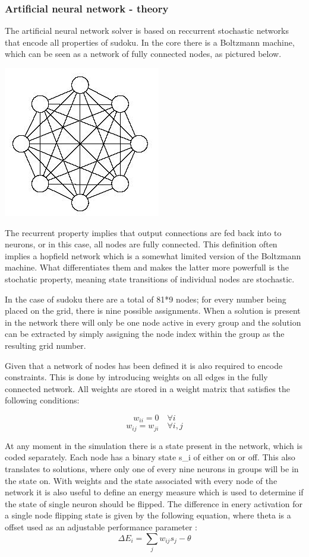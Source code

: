 \documentclass[a4paper,11pt]{kth-mag}
\begin{document}
\subsubsection{Artificial neural network - theory}
The artificial neural network solver is based on reccurrent stochastic networks that encode all properties of sudoku.
In the core there is a Boltzmann machine, which can be seen as a network of fully connected nodes, as pictured below.

\includegraphics{images/neural1.png}

The recurrent property implies that output connections are fed back into to neurons, or in this case, all nodes are fully connected.
This definition often implies a hopfield network which is a somewhat limited version of the Boltzmann machine.
What differentiates them and makes the latter more powerfull is the stochatic property, meaning state transitions of individual nodes are stochastic.

In the case of sudoku there are a total of 81*9 nodes; for every number being placed on the grid, there is nine possible assignments.
When a solution is present in the network there will only be one node active in every group and the solution can be extracted by simply assigning the node index within the group as the resulting grid number.

Given that a network of nodes has been defined it is also required to encode constraints.
This is done by introducing weights on all edges in the fully connected network.
All weights are stored in a weight matrix that satisfies the following conditions:

\[
w_{ii} = 0 \quad \forall i
\]
\[
w_{ij} = w_{ji} \quad \forall i,j
\]

At any moment in the simulation there is a state present in the network, which is coded separately.
Each node has a binary state s\_i of either on or off.
This also translates to solutions, where only one of every nine neurons in groups will be in the state on.
With weights and the state associated with every node of the network it is also useful to define an energy measure which is used to determine if the state of single neuron should be flipped.
The difference in enery activation for a single node flipping state is given by the following equation, where theta is a offset used as an adjustable performance parameter \cite{boltzmann2}:
\[
\Delta E_{i} = \sum_{j} w_{ij} s_{j} - \theta
\]
\end{document}
